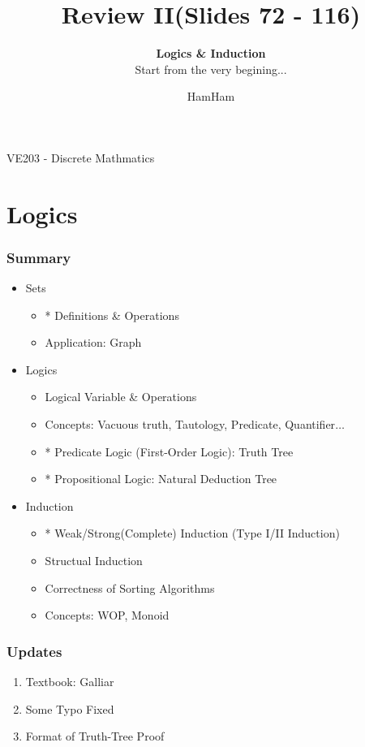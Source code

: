 \documentclass{beamer}
\title{\sffamily Review II(Slides 72 - 116)}
\subtitle{\textbf{Logics \& Induction }\\ Start from the very begining...}
\institute[UM-SJTU JI]{University of Michigan-Shanghai Jiao Tong University Joint Institute}
\author{HamHam}
\newcommand{\myfont}{\rmfamily\normalsize\upshape\mdseries}
\begin{document}
\begin{titlepage}
    \begin{center}
        VE203 - Discrete Mathmatics 
    \end{center}
\end{titlepage}
\myfont
\section{Logics}
\begin{frame}
    \frametitle{Summary}
    \begin{itemize}
        \item Sets
        \begin{itemize}
            \item * Definitions \& Operations
            \item Application: Graph
        \end{itemize}
        \item Logics
        \begin{itemize}
            \item Logical Variable \& Operations
            \item Concepts: Vacuous truth, Tautology, Predicate, Quantifier$\dots$
            \item * Predicate Logic (First-Order Logic): Truth Tree
            \item * Propositional Logic: Natural Deduction Tree
        \end{itemize}
        \item Induction
        \begin{itemize}
            \item * Weak/Strong(Complete) Induction (Type I/II Induction)
            \item Structual Induction
            \item Correctness of Sorting Algorithms
            \item Concepts: WOP, Monoid
        \end{itemize}
    \end{itemize}
\end{frame}
\begin{frame}
    \frametitle{Updates}
    \begin{enumerate}
        \item Textbook: Galliar
        \item Some Typo Fixed
        \item Format of Truth-Tree Proof
    \end{enumerate}

\end{frame}
\end{document}
